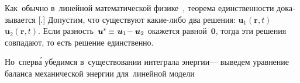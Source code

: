 \begin{otherlanguage}{russian}

Как~обычно в~линейной математической физике~\cite{lurie-theoryofelasticity, tihonovsamarsky-mathphysicsequations}, теорема единственности доказывается [.]
Допустим, что существуют какие-либо два решения: ${\bm{u}_1 (\bm{r}, t)}$ ~${\bm{u}_2 (\bm{r}, t)}$.
Если разность~${\bm{u}^{\hspace{-0.1ex}*} \hspace{-0.2ex} \equiv \hspace{.12ex} \bm{u}_1 \hspace{-0.4ex} - \bm{u}_2}$ окажется равной~$\bm{0}$, тогда эти решения совпадают, то есть решение единственно.

Но~сперв\'{а} убедимся в~существовании интеграла энергии\:--- выведем уравнение баланса механической энергии для~линейной модели


\end{otherlanguage}
